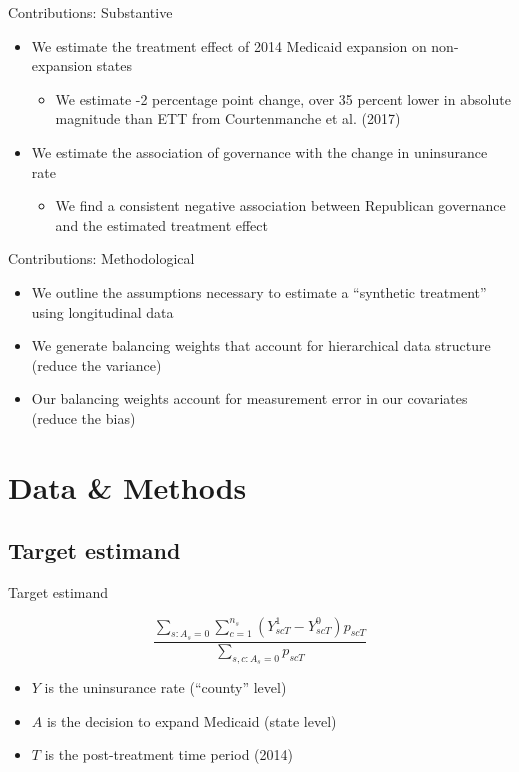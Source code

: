 \documentclass[hyperref={pdfpagelabels=false}]{beamer}
\begin{document}
\begin{frame}{Contributions: Substantive}
\begin{itemize}
    \item We estimate the treatment effect of 2014 Medicaid expansion on non-expansion states \bigskip
    
    \begin{itemize}
        \item We estimate -2 percentage point change, over 35 percent lower in absolute magnitude than ETT from Courtenmanche et al. (2017) \bigskip 
    \end{itemize}

    \item We estimate the association of governance with the change in uninsurance rate \bigskip
    
    \begin{itemize}
        \item We find a consistent negative association between Republican governance and the estimated treatment effect \bigskip 
    \end{itemize}
    \end{itemize}
\end{frame}

\begin{frame}{Contributions: Methodological}
\begin{itemize}
    \item We outline the assumptions necessary to estimate a ``synthetic treatment'' using longitudinal data \bigskip
    
    \item We generate balancing weights that account for hierarchical data structure (reduce the variance) \bigskip
    
    \item Our balancing weights account for measurement error in our covariates (reduce the bias) \bigskip
    \end{itemize}
\end{frame}

\section{Data \& Methods}

\subsection{Target estimand}

\begin{frame}{Target estimand}

$$
\frac{\sum_{s: A_s = 0} \sum_{c = 1}^{n_s} (Y_{scT}^1 - Y_{scT}^0)p_{scT}}{\sum_{s, c : A_s = 0}p_{scT}}
$$

\begin{itemize}
    \item $Y$ is the uninsurance rate (``county'' level) \bigskip
    \item $A$ is the decision to expand Medicaid (state level) \bigskip
    \item $T$ is the post-treatment time period (2014)
\end{itemize}
\end{frame}
\end{document}
